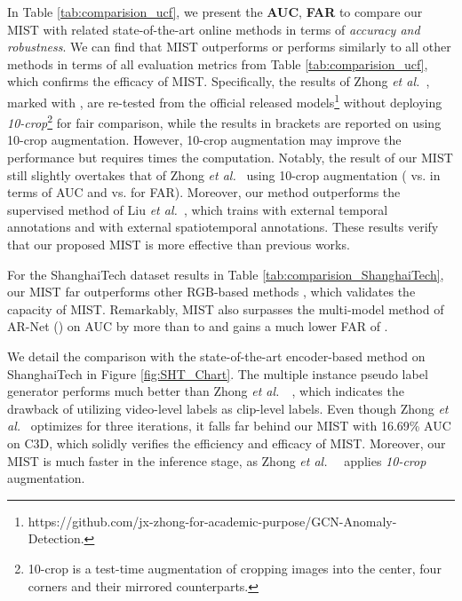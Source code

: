 \documentclass[final]{cvpr}
\newcommand{\jcnd}{\textcolor[rgb]{0,0.,0}}
\newcommand{\jcca}{\textcolor[rgb]{0,0,0}}
\newcommand{\et}{\textit{et al.\ }}
\begin{document}
In Table \ref{tab:comparision_ucf}, we present the \textbf{AUC}, \textbf{FAR} to compare our MIST with related state-of-the-art \jcca{online} methods in terms of \textit{accuracy and robustness}. We can find that MIST outperforms or performs similarly to all other methods in terms of all evaluation metrics from Table \ref{tab:comparision_ucf}, which confirms the efficacy of MIST.
Specifically, the results of Zhong \et \cite{zhong2019graph}, marked with , are re-tested from the official released models\footnote{https://github.com/jx-zhong-for-academic-purpose/GCN-Anomaly-Detection.} without deploying \textit{10-crop}\footnote{10-crop is a test-time augmentation of cropping images into the center, four corners and their mirrored counterparts.} for fair comparison, while the results in brackets are reported on \cite{zhong2019graph} using 10-crop augmentation. However, 10-crop augmentation may improve the performance but requires  times the computation. 
Notably, the result of our MIST still slightly overtakes that of Zhong \et  \cite{zhong2019graph} using 10-crop augmentation ( vs.  in terms of AUC and  vs.  for FAR).  Moreover, our method outperforms the supervised method of Liu \et  \cite{liu2019exploring}, which trains  with external temporal annotations and  with external spatiotemporal annotations. 
These results verify that our proposed MIST is more effective than previous works.

For the ShanghaiTech dataset results in Table \ref{tab:comparision_ShanghaiTech}, our MIST far outperforms other RGB-based methods \cite{sultani2018real,zhang2019temporal,zhong2019graph,wan2020weakly}, which validates the capacity of MIST. Remarkably, MIST also surpasses the multi-model method of AR-Net \cite{wan2020weakly} () on AUC by more than  to  and gains a much lower FAR of .


\jcnd{We detail the comparison with the state-of-the-art encoder-based method \cite{zhong2019graph} on ShanghaiTech in Figure \ref{fig:SHT_Chart}. The multiple instance pseudo label generator performs much better than Zhong \et \ \cite{zhong2019graph}, which indicates the drawback of utilizing video-level labels as clip-level labels. Even though Zhong \et  \cite{zhong2019graph} optimizes for three iterations, it falls far behind our MIST with 16.69\% AUC on C3D, which solidly verifies the efficiency and efficacy of  MIST. Moreover, our MIST is much faster in the inference stage, as Zhong \et \ \cite{zhong2019graph} applies \textit{10-crop} augmentation.}
\end{document}
